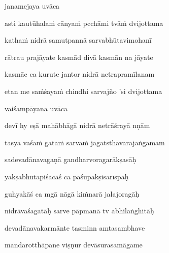 janamejaya uvāca~{\dandab}\dontdisplaylinenum 

asti kautūhalaṁ cānyaṁ pcchāmi tvāṁ dvijottama\thinspace{\danda} \dontdisplaylinenum

kathaṁ nidrā samutpannā sarvabhūtavimohanī \veg\dontdisplaylinenum
{}

rātrau prajāyate kasmād divā kasmān na jāyate\thinspace{\dandab} \dontdisplaylinenum

kasmāc ca kurute jantor nidrā netrapramīlanam \danda\dontdisplaylinenum

etan me saṁśayaṁ chindhi sarvajño 'si dvijottama \veg\dontdisplaylinenum
{}

vaiśampāyana uvāca~{\dandab}\dontdisplaylinenum 

devī hy eṣā mahābhāgā nidrā netrāśrayā nṇām\thinspace{\danda} \dontdisplaylinenum

tasyā vaśaṁ gataṁ sarvaṁ jagatsthāvarajaṅgamam \veg\dontdisplaylinenum
{}

sadevadānavagaṇā gandharvoragarākṣasāḥ\thinspace{\dandab} \dontdisplaylinenum

yakṣabhūtapiśācāś ca paśupakṣisarīspāḥ \veg\dontdisplaylinenum
{}

guhyakāś ca mgā nāgā kiṁnarā jalajoragāḥ\thinspace{\dandab} \dontdisplaylinenum

nidrāvaśagatāḥ sarve pāpmanā tv abhilaṅghitāḥ \veg\dontdisplaylinenum
{}

devadānavakarmānte tasminn amtasambhave\thinspace{\dandab} \dontdisplaylinenum

mandarotthāpane viṣṇur devāsurasamāgame \veg\dontdisplaylinenum
{}

